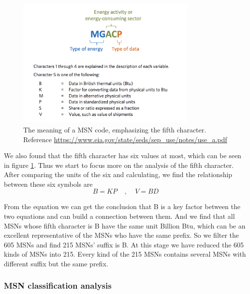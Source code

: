 \documentclass[a4paper,11pt]{article}
\begin{document}
\begin{figure}[h]%
    \centering 
    \includegraphics[width=0.8\textwidth]{./Pic/msn_5.png}
    \caption{The meaning of a MSN code, emphasizing the fifth character. Reference \url{https://www.eia.gov/state/seds/sep_use/notes/use_a.pdf}}
    \label{fig:msn_5}  
\end{figure}
\par We also found that the fifth character has six values at most, which can be seen in figure \ref{fig:msn_5}. Thus we start to focus more on the analysis of the fifth character. After comparing the units of the six and calculating, we find the relationship between these six symbols are
\begin{equation}
    B=KP~~~~~,~~~~~V=BD
\end{equation}

\par From the equation we can get the conclusion that B is a key factor between the two equations and can build a connection between them. And we find that all MSNs whose fifth character is B have the same unit Billion Btu, which can be an excellent representative of the MSNs who have the same prefix. So we filter the 605 MSNs and find 215 MSNs' suffix is B. At this stage we have reduced the 605 kinds of MSNs into 215. Every kind of the 215 MSNs contains several MSNs with different suffix but the same prefix.

\subsubsection {MSN classification analysis}
\end{document}
